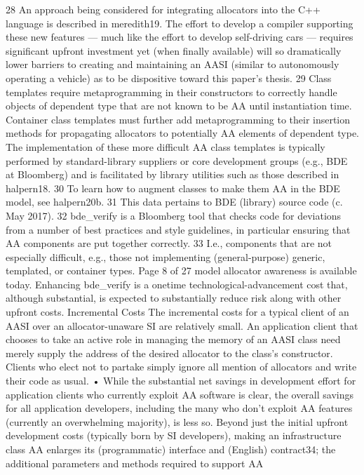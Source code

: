 28 An approach being considered for integrating allocators into the C++ language is described in
meredith19. The effort to develop a compiler supporting these new features — much like the effort to
develop self-driving cars — requires significant upfront investment yet (when finally available) will so
dramatically lower barriers to creating and maintaining an AASI (similar to autonomously operating a
vehicle) as to be dispositive toward this paper’s thesis.
29 Class templates require metaprogramming in their constructors to correctly handle objects of
dependent type that are not known to be AA until instantiation time. Container class templates must
further add metaprogramming to their insertion methods for propagating allocators to potentially AA
elements of dependent type. The implementation of these more difficult AA class templates is typically
performed by standard-library suppliers or core development groups (e.g., BDE at Bloomberg) and is
facilitated by library utilities such as those described in halpern18. 30 To learn how to augment classes to make them AA in the BDE model, see halpern20b. 31 This data pertains to BDE (library) source code (c. May 2017). 32 bde_verify is a Bloomberg tool that checks code for deviations from a number of best practices
and style guidelines, in particular ensuring that AA components are put together correctly.
33 I.e., components that are not especially difficult, e.g., those not implementing (general-purpose)
generic, templated, or container types.
Page 8 of 27
model allocator awareness is available today. Enhancing bde_verify is a onetime technological-advancement cost that, although substantial, is expected
to substantially reduce risk along with other upfront costs.
Incremental Costs
The incremental costs for a typical client of an AASI over an allocator-unaware SI are
relatively small. An application client that chooses to take an active role in managing
the memory of an AASI class need merely supply the address of the desired allocator
to the class’s constructor. Clients who elect not to partake simply ignore all mention
of allocators and write their code as usual.
• While the substantial net savings in development effort for application clients
who currently exploit AA software is clear, the overall savings for all
application developers, including the many who don’t exploit AA features
(currently an overwhelming majority), is less so. Beyond just the initial
upfront development costs (typically born by SI developers), making an
infrastructure class AA enlarges its (programmatic) interface and (English)
contract34; the additional parameters and methods required to support AA
